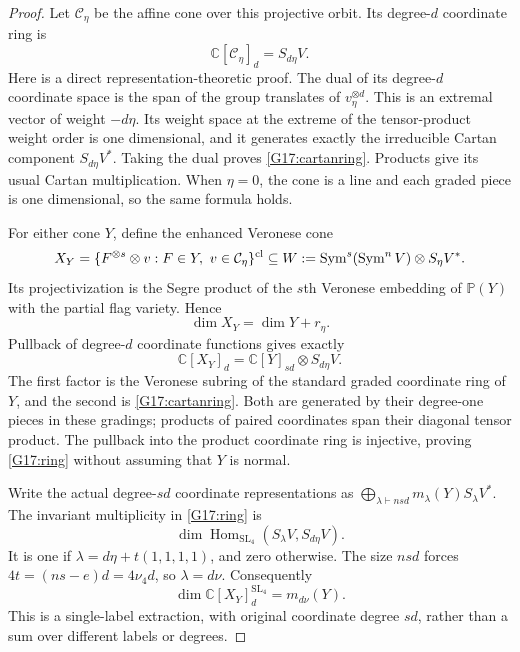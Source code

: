 \begin{proof}
Let $\mathcal C_\eta$ be the affine cone over this projective orbit.
Its degree-$d$ coordinate ring is
\begin{equation}\label{G17:cartanring}
 \mathbb C[\mathcal C_\eta]_d=S_{d\eta}V.
\end{equation}
Here is a direct representation-theoretic proof. The dual of its
degree-$d$ coordinate space is the span of the group translates of
$v_\eta^{\otimes d}$. This is an extremal vector of weight $-d\eta$.
Its weight space at the extreme of the tensor-product weight order
is one dimensional, and it generates exactly the irreducible Cartan
component $S_{d\eta}V^*$. Taking the dual proves
\eqref{G17:cartanring}. Products give its usual Cartan multiplication.
When $\eta=0$, the cone is a line and each graded piece is
one dimensional, so the same formula holds.

For either cone $Y$, define the enhanced Veronese cone
\begin{equation}\label{G17:enhancement}
 X_Y=\{F^{\otimes s}\otimes v:F\in Y,\ v\in\mathcal C_\eta\}^{\rm cl}
 \subseteq W:=\operatorname{Sym}^s(\operatorname{Sym}^n V)
                      \otimes S_\eta V^*.
\end{equation}
Its projectivization is the Segre product of the $s$th Veronese
embedding of $\mathbb P(Y)$ with the partial flag variety. Hence
\begin{equation}\label{G17:dimension}
 \dim X_Y=\dim Y+r_\eta.
\end{equation}
Pullback of degree-$d$ coordinate functions gives exactly
\begin{equation}\label{G17:ring}
 \mathbb C[X_Y]_d=\mathbb C[Y]_{sd}\otimes S_{d\eta}V.
\end{equation}
The first factor is the Veronese subring of the standard graded
coordinate ring of $Y$, and the second is \eqref{G17:cartanring}.
Both are generated by their degree-one pieces in these gradings;
products of paired coordinates span their diagonal tensor product.
The pullback into the product coordinate ring is injective, proving
\eqref{G17:ring} without assuming that $Y$ is normal.

Write the actual degree-$sd$ coordinate representations as
$\bigoplus_{\lambda\vdash nsd}m_\lambda(Y)S_\lambda V^*$.
The invariant multiplicity in \eqref{G17:ring} is
\[
 \dim\operatorname{Hom}_{\mathrm{SL}_4}
                   (S_\lambda V,S_{d\eta}V).
\]
It is one if $\lambda=d\eta+t(1,1,1,1)$, and zero otherwise.
The size $nsd$ forces
$4t=(ns-e)d=4\nu_4d$, so $\lambda=d\nu$.
Consequently
\begin{equation}\label{G17:extraction}
 \dim\mathbb C[X_Y]_d^{\mathrm{SL}_4}=m_{d\nu}(Y).
\end{equation}
This is a single-label extraction, with original coordinate degree
$sd$, rather than a sum over different labels or degrees.


\end{proof}
